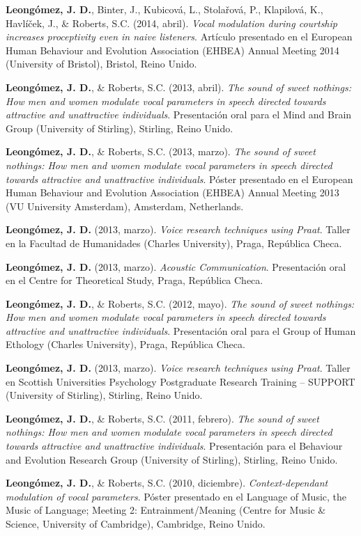 \documentclass[11pt,a4paper,]{awesome-cv}
\begin{document}
\textbf{Leongómez, J. D.}, Binter, J., Kubicová, L., Stolařová, P.,
Klapilová, K., Havlíček, J., \& Roberts, S.C. (2014, abril). \emph{Vocal
modulation during courtship increases proceptivity even in naive
listeners}. Artículo presentado en el European Human Behaviour and
Evolution Association (EHBEA) Annual Meeting 2014 (University of
Bristol), Bristol, Reino Unido.

\textbf{Leongómez, J. D.}, \& Roberts, S.C. (2013, abril). \emph{The
sound of sweet nothings: How men and women modulate vocal parameters in
speech directed towards attractive and unattractive individuals}.
Presentación oral para el Mind and Brain Group (University of Stirling),
Stirling, Reino Unido.

\textbf{Leongómez, J. D.}, \& Roberts, S.C. (2013, marzo). \emph{The
sound of sweet nothings: How men and women modulate vocal parameters in
speech directed towards attractive and unattractive individuals}. Póster
presentado en el European Human Behaviour and Evolution Association
(EHBEA) Annual Meeting 2013 (VU University Amsterdam), Amsterdam,
Netherlands.

\textbf{Leongómez, J. D.} (2013, marzo). \emph{Voice research techniques
using Praat}. Taller en la Facultad de Humanidades (Charles University),
Praga, República Checa.

\textbf{Leongómez, J. D.} (2013, marzo). \emph{Acoustic Communication}.
Presentación oral en el Centre for Theoretical Study, Praga, República
Checa.

\textbf{Leongómez, J. D.}, \& Roberts, S.C. (2012, mayo). \emph{The
sound of sweet nothings: How men and women modulate vocal parameters in
speech directed towards attractive and unattractive individuals}.
Presentación oral para el Group of Human Ethology (Charles University),
Praga, República Checa.

\textbf{Leongómez, J. D.} (2013, marzo). \emph{Voice research techniques
using Praat}. Taller en Scottish Universities Psychology Postgraduate
Research Training -- SUPPORT (University of Stirling), Stirling, Reino
Unido.

\textbf{Leongómez, J. D.}, \& Roberts, S.C. (2011, febrero). \emph{The
sound of sweet nothings: How men and women modulate vocal parameters in
speech directed towards attractive and unattractive individuals}.
Presentación para el Behaviour and Evolution Research Group (University
of Stirling), Stirling, Reino Unido.

\textbf{Leongómez, J. D.}, \& Roberts, S.C. (2010, diciembre).
\emph{Context-dependant modulation of vocal parameters}. Póster
presentado en el Language of Music, the Music of Language; Meeting 2:
Entrainment/Meaning (Centre for Music \& Science, University of
Cambridge), Cambridge, Reino Unido.
\end{document}
